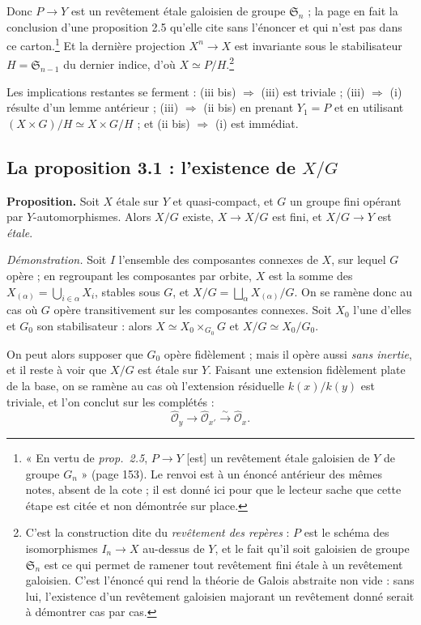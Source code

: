 \documentclass[11pt,a4paper]{article}
\begin{document}
Donc $P \to Y$ est un revêtement étale galoisien de groupe
$\mathfrak{S}_{n}$ ; la page en fait la conclusion d'une proposition 2.5
qu'elle cite sans l'énoncer et qui n'est pas dans ce carton.\footnote{« En
vertu de \emph{prop.\ 2.5}, $P \to Y$ [est] un revêtement étale galoisien de
$Y$ de groupe $G_n$ » (page 153). Le renvoi est à un énoncé antérieur des
mêmes notes, absent de la cote ; il est donné ici pour que le lecteur sache
que cette étape est citée et non démontrée sur place.} Et la dernière
projection $X^{n} \to X$ est invariante sous
le stabilisateur $H = \mathfrak{S}_{n-1}$ du dernier indice, d'où
$X \simeq P/H$.\footnote{C'est la construction dite du \emph{revêtement des
repères} : $P$ est le schéma des isomorphismes $I_{n} \to X$ au-dessus de $Y$,
et le fait qu'il soit galoisien de groupe $\mathfrak{S}_{n}$ est ce qui permet
de ramener tout revêtement fini étale à un revêtement galoisien. C'est l'énoncé
qui rend la théorie de Galois abstraite non vide : sans lui, l'existence d'un
revêtement galoisien majorant un revêtement donné serait à démontrer cas par
cas.}

Les implications restantes se ferment : (iii bis) $\Rightarrow$ (iii) est
triviale ; (iii) $\Rightarrow$ (i) résulte d'un lemme antérieur ; (iii)
$\Rightarrow$ (ii bis) en prenant $Y_{1} = P$ et en utilisant
$(X \times G)/H \simeq X \times G/H$ ; et (ii bis) $\Rightarrow$ (i) est
immédiat.

\subsection*{La proposition 3.1 : l'existence de $X/G$}

\textbf{Proposition.} Soit $X$ étale sur $Y$ et quasi-compact, et $G$ un groupe
fini opérant par $Y$-automorphismes. Alors $X/G$ existe, $X \to X/G$ est fini,
et $X/G \to Y$ est \emph{étale}.

\emph{Démonstration.} Soit $I$ l'ensemble des composantes connexes de $X$, sur
lequel $G$ opère ; en regroupant les composantes par orbite, $X$ est la somme
des $X_{(\alpha)} = \bigcup_{i \in \alpha} X_{i}$, stables sous $G$, et
$X/G = \bigsqcup_{\alpha} X_{(\alpha)}/G$. On se ramène donc au cas où $G$
opère transitivement sur les composantes connexes. Soit $X_{0}$ l'une d'elles
et $G_{0}$ son stabilisateur : alors $X \simeq X_{0} \times_{G_{0}} G$ et
$X/G \simeq X_{0}/G_{0}$.

On peut alors supposer que $G_{0}$ opère fidèlement ; mais il opère aussi
\emph{sans inertie}, et il reste à voir que $X/G$ est étale sur $Y$. Faisant
une extension fidèlement plate de la base, on se ramène au cas où l'extension
résiduelle $k(x)/k(y)$ est triviale, et l'on conclut sur les complétés :
\[
  \hat{\mathcal{O}}_{y} \longrightarrow \hat{\mathcal{O}}_{x'}
  \xrightarrow{\ \sim\ } \hat{\mathcal{O}}_{x} .
\]
\end{document}
